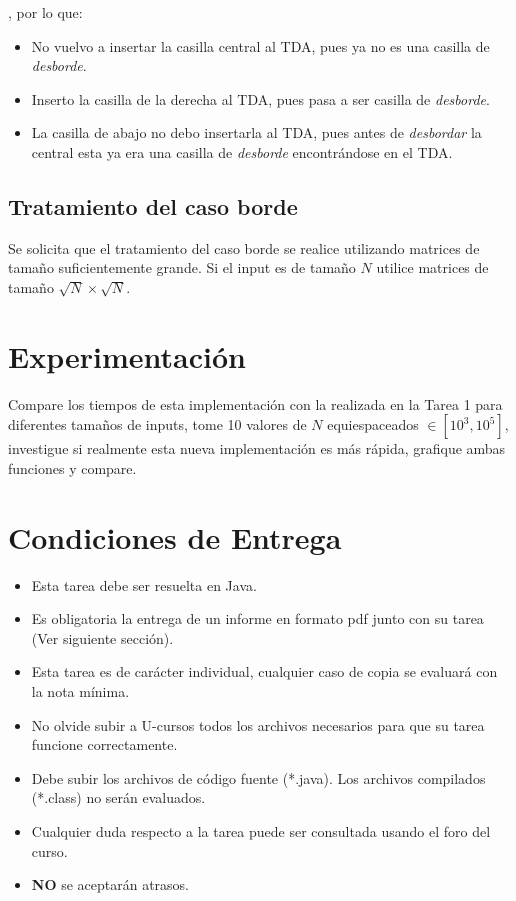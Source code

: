 \documentclass[dcc]{fcfmcourse}
\begin{document}
\newpage
, por lo que:
\begin{itemize}
    \item No vuelvo a insertar la casilla central al TDA, pues ya no es una casilla de \textit{desborde}.
    \item Inserto la casilla de la derecha al TDA, pues pasa a ser casilla de \textit{desborde}.
    \item La casilla de abajo no debo insertarla al TDA, pues antes de \textit{desbordar} la central esta ya era una casilla de \textit{desborde} encontrándose en el TDA.
\end{itemize}

\subsection{Tratamiento del caso borde}
Se solicita que el tratamiento del caso borde se realice utilizando matrices de tamaño suficientemente grande. Si el input es de tamaño $N$ utilice matrices de tamaño $\sqrt{N}\times\sqrt{N}$.
\section{Experimentación}

Compare los tiempos de esta implementación con la realizada en la Tarea 1 para diferentes tamaños de inputs, tome 10 valores de $N$ equiespaceados  $\in [10^3, 10^5]$, investigue si realmente esta nueva implementación es más rápida, grafique ambas funciones y compare.
\section{Condiciones de Entrega}

\begin{itemize}
    \item Esta tarea debe ser resuelta en Java.
    \item Es obligatoria la entrega de un informe en formato pdf junto con su tarea (Ver siguiente sección).
    \item Esta tarea es de carácter individual, cualquier caso de copia se evaluará con la nota mínima.
    \item No olvide subir a U-cursos todos los archivos necesarios para que su tarea funcione correctamente.
    \item Debe subir los archivos de código fuente (*.java). Los archivos compilados (*.class) no serán evaluados.
    \item Cualquier duda respecto a la tarea puede ser consultada usando el foro del curso.
    \item \textbf{NO} se aceptarán atrasos.
\end{itemize}
\end{document}
